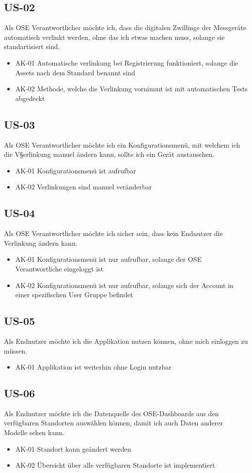 \subsection{US-02}
Als OSE Verantwortlicher möchte ich, dass die digitalen Zwillinge der Messgeräte automatisch verlinkt werden, ohne das ich etwas machen muss, solange sie standartisiert sind.
\begin{itemize}
  \item AK-01 Automatische verlinkung bei Registrierung funktioniert, solange die Assets nach dem Standard benannt sind
  \item AK-02 Methode, welche die Verlinkung vornimmt ist mit automatischen Tests abgedeckt
\end{itemize}
\subsection{US-03}
Als OSE Verantwortlicher möchte ich ein Konfigurationsmenü, mit welchem ich die V§erlinkung manuel ändern kann, sollte ich ein Gerät austauschen.
\begin{itemize}
  \item AK-01 Konfigurationsmenü ist aufrufbar
  \item AK-02 Verlinkungen sind manuel veränderbar
\end{itemize}
\subsection{US-04}
Als OSE Verantwortlicher möchte ich sicher sein, dass kein Endnutzer die Verlinkung ändern kann.
\begin{itemize}
  \item AK-01 Konfigurationsmenü ist nur aufrufbar, solange der OSE Verantwortliche eingeloggt ist
  \item AK-02 Konfigurationsmenü ist nur aufrufbar, solange sich der Account in einer spezifischen User Gruppe befindet
\end{itemize}
\subsection{US-05}
Als Endnutzer möchte ich die Applikation nutzen können, ohne mich einloggen zu müssen.
\begin{itemize}
  \item AK-01 Applikation ist weiterhin ohne Login nutzbar
\end{itemize}
\subsection{US-06}
Als Endnutzer möchte ich die Datenquelle des OSE-Dashboards aus den verfügbaren Standorten auswählen können, damit ich auch Daten anderer Modelle sehen kann.
\begin{itemize}
  \item AK-01 Standort kann geändert werden
  \item AK-02 Übersicht über alle verfügbaren Standorte ist implementiert
\end{itemize}
